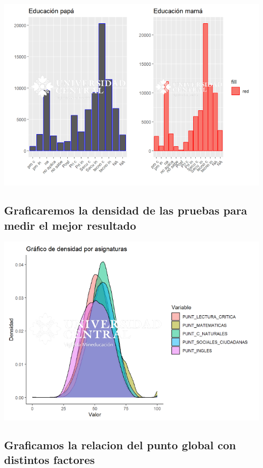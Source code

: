 \documentclass{article}
\begin{document}
\begin{center}
\includegraphics[scale=0.5]{Captura18.PNG} 
\end{center}

\subsection{Graficaremos la densidad de las pruebas para medir el mejor resultado}

\begin{center}
\includegraphics[scale=0.5]{Captura19.PNG} 
\end{center}

\subsection{Graficamos la relacion del punto global con distintos factores}
\end{document}
